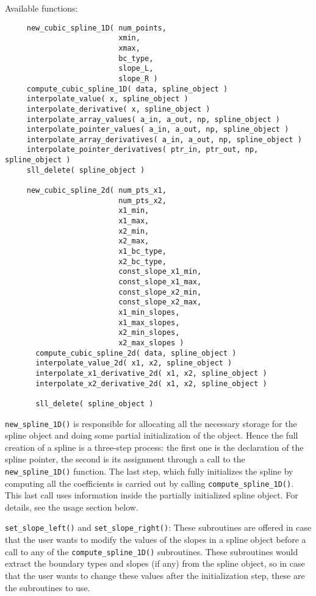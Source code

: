 \documentclass[]{report}   %
\begin{document}
Available functions:
\begin{verbatim}
     new_cubic_spline_1D( num_points, 
                          xmin, 
                          xmax, 
                          bc_type, 
                          slope_L, 
                          slope_R )  
     compute_cubic_spline_1D( data, spline_object )
     interpolate_value( x, spline_object )
     interpolate_derivative( x, spline_object )
     interpolate_array_values( a_in, a_out, np, spline_object )
     interpolate_pointer_values( a_in, a_out, np, spline_object )
     interpolate_array_derivatives( a_in, a_out, np, spline_object )
     interpolate_pointer_derivatives( ptr_in, ptr_out, np, spline_object )
     sll_delete( spline_object )
     
     new_cubic_spline_2d( num_pts_x1,  
                          num_pts_x2,  
                          x1_min,      
                          x1_max,     
                          x2_min,      
                          x2_max,     
                          x1_bc_type, 
                          x2_bc_type,  
                          const_slope_x1_min,
                          const_slope_x1_max,
                          const_slope_x2_min, 
                          const_slope_x2_max,
                          x1_min_slopes,
                          x1_max_slopes,
                          x2_min_slopes, 
                          x2_max_slopes )
       compute_cubic_spline_2d( data, spline_object )
       interpolate_value_2d( x1, x2, spline_object )
       interpolate_x1_derivative_2d( x1, x2, spline_object )
       interpolate_x2_derivative_2d( x1, x2, spline_object )      
       
       sll_delete( spline_object )             
\end{verbatim}
\verb+new_spline_1D()+ is responsible for allocating all the necessary storage for the spline object and doing some partial initialization of the object. Hence the full creation of a spline is a three-step process: the first one is the declaration of the spline pointer, the second is its assignment through a call to the \verb+new_spline_1D()+ function. The last step, which fully initializes the spline by computing all the coefficients is carried out by calling \verb+compute_spline_1D()+. This last call uses information inside the partially initialized spline object. For details, see the usage section below. 

\verb+set_slope_left()+ and \verb+set_slope_right()+: These subroutines are offered in case that the user wants to modify the values of the slopes in a spline object before a call to any of the \verb+compute_spline_1D()+ subroutines. These subroutines would extract the boundary types and slopes (if any) from the spline object, so in case that the user wants to change these values after the initialization step, these are the subroutines to use.
\end{document}
